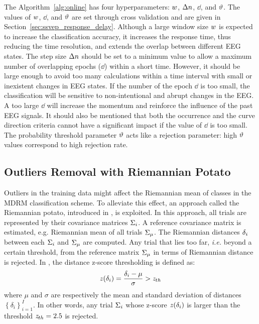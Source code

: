 The Algorithm~\ref{alg:online} has four hyperparameters: $\ws$, $\deltaN$, $\dd$, and $\pthres$.
The values of $\ws$, $\dd$, and $\pthres$ are set through cross validation and are given in Section~\ref{sec:ssvep_response_delay}.
Although a large window size $\ws$ is expected to increase the classification accuracy, it increases the response time, thus reducing the time resolution, and extends the overlap between different EEG states.
The step size $\deltaN$ should be set to a minimum value to allow a maximum number of overlapping epochs ($\dd$) within a short time. 
However, it should be large enough to avoid too many calculations within a time interval with small or inexistent changes in EEG states.
If the number of the epoch  $\dd$ is too small, the classification will be sensitive to non-intentional and abrupt changes in the EEG.
A too large $\dd$ will increase the momentum and reinforce the influence of the past EEG signals.
It should also be mentioned that both the occurrence and the curve direction criteria cannot have a significant impact if the value of $\dd$ is too small.
The probability threshold parameter $\pthres$ acts like a rejection parameter: high $\pthres$ values correspond to high rejection rate. 

\subsection{Outliers Removal with Riemannian Potato}
\label{sec:potato} 
Outliers in the training data might affect the Riemannian mean of classes in the MDRM classification scheme.
To alleviate this effect, an approach called the Riemannian potato, introduced in \citep{barachant_riemannian_2013}, is exploited.
In this approach, all trials are represented by their covariance matrices $\P_i$.
A reference covariance matrix is estimated, e.g. Riemannian mean of all trials $\P_{\mu}$.
The Riemannian distances $\distR_i$ between each $\P_i$ and $\P_{\mu}$ are computed. 
Any trial that lies too far, \textit{i.e.} beyond a certain threshold, from the reference matrix $\P_{\mu}$ in terms of Riemannian distance is rejected.
In \citep{barachant_riemannian_2013}, the distance z-score thresholding is defined as:
\begin{equation}
	\zs(\distR_i) = \frac{\distR_i - \mu}{\sigma} > \zs_{th}
\label{eq:potato}
\end{equation}
where $\mu$ and $\sigma$ are respectively the mean and standard deviation of distances $\left\{ \delta_i \right\}_{i=1}^I$. 
In other words, any trial $\P_i$ whose z-score $\zs(\distR_i)$ is larger than the threshold $\zs_{th}=2.5$ is rejected.

